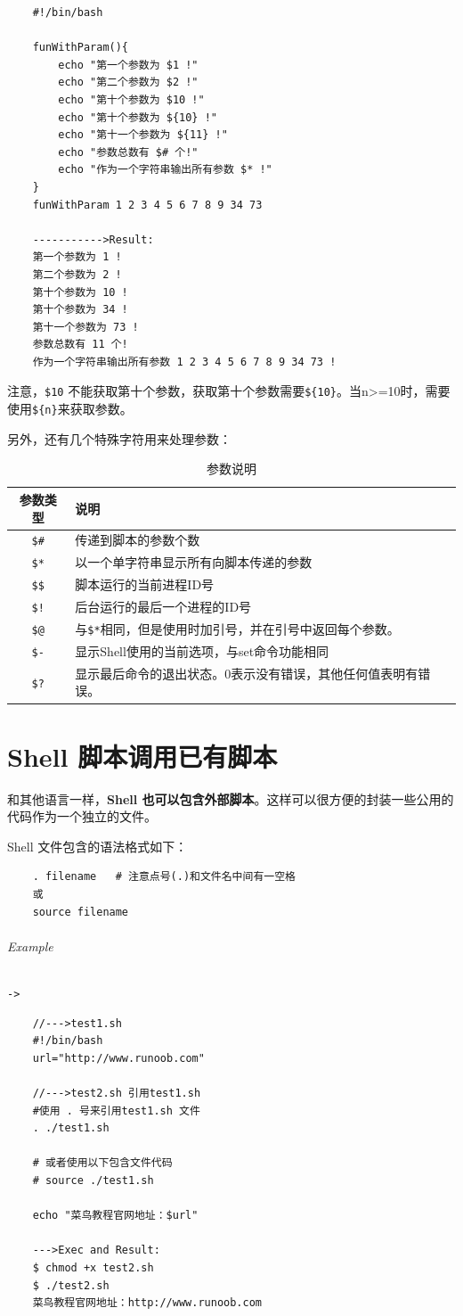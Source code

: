 \documentclass[UTF8,a4paper,12pt]{ctexbook}
\begin{document}
				\begin{lstlisting}
	#!/bin/bash
	
	funWithParam(){
		echo "第一个参数为 $1 !"
		echo "第二个参数为 $2 !"
		echo "第十个参数为 $10 !"
		echo "第十个参数为 ${10} !"
		echo "第十一个参数为 ${11} !"
		echo "参数总数有 $# 个!"
		echo "作为一个字符串输出所有参数 $* !"
	}
	funWithParam 1 2 3 4 5 6 7 8 9 34 73
	
	----------->Result:
	第一个参数为 1 !
	第二个参数为 2 !
	第十个参数为 10 !
	第十个参数为 34 !
	第十一个参数为 73 !
	参数总数有 11 个!
	作为一个字符串输出所有参数 1 2 3 4 5 6 7 8 9 34 73 !
				\end{lstlisting}
			
			注意，\verb|$10| 不能获取第十个参数，获取第十个参数需要\verb|${10}|。当n>=10时，需要使用\verb|${n}|来获取参数。 
			
			另外，还有几个特殊字符用来处理参数：
			\begin{table}[H]
				\centering
				\begin{tabular}{c|m{13cm}}
					\hline
				     参数类型   &  说明\\
					\hline 
					\verb|$#| & 传递到脚本的参数个数\\
					\verb|$*| & 以一个单字符串显示所有向脚本传递的参数\\
					\verb|$$| & 脚本运行的当前进程ID号\\
					\verb|$!| & 后台运行的最后一个进程的ID号\\
					\verb|$@| & 与\verb|$*|相同，但是使用时加引号，并在引号中返回每个参数。\\
					\verb|$-| & 显示Shell使用的当前选项，与set命令功能相同\\
					\verb|$?| & 显示最后命令的退出状态。0表示没有错误，其他任何值表明有错误。\\					
					\hline
				\end{tabular}
				\caption{参数说明}
			\end{table}
			
\chapter{Shell 脚本调用已有脚本}
		 和其他语言一样，\textbf{Shell 也可以包含外部脚本}。这样可以很方便的封装一些公用的代码作为一个独立的文件。
		 
		 Shell 文件包含的语法格式如下：
		 	\begin{lstlisting}
	. filename   # 注意点号(.)和文件名中间有一空格
	或	
	source filename
			\end{lstlisting}
			\subparagraph{Example}\verb|->|
				\begin{lstlisting}
	//--->test1.sh
	#!/bin/bash
	url="http://www.runoob.com"
	
	//--->test2.sh 引用test1.sh
	#使用 . 号来引用test1.sh 文件
	. ./test1.sh
	
	# 或者使用以下包含文件代码
	# source ./test1.sh
	
	echo "菜鸟教程官网地址：$url"
	
	--->Exec and Result:
	$ chmod +x test2.sh 
	$ ./test2.sh 
	菜鸟教程官网地址：http://www.runoob.com
		 		\end{lstlisting}	
		 	
\end{document}
